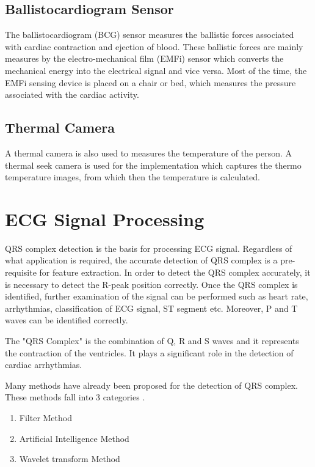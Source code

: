 \subsection{Ballistocardiogram Sensor}
The ballistocardiogram (BCG) sensor measures the ballistic forces associated with cardiac contraction and ejection of blood. These ballistic forces are mainly measures by the electro-mechanical film (EMFi) sensor which converts the mechanical energy into the electrical signal and vice versa. Most of the time, the EMFi sensing device is placed on a chair or bed, which measures the pressure associated with the cardiac activity.

\subsection{Thermal Camera}
A thermal camera is also used to measures the temperature of the person. A thermal seek camera is used for the implementation which captures the thermo temperature images, from which then the temperature is calculated.

\section{ECG Signal Processing}
QRS complex detection is the basis for processing ECG signal. Regardless of what application is required, the accurate detection of QRS complex is a pre-requisite for feature extraction. In order to detect the QRS complex accurately, it is necessary to detect the R-peak position correctly. Once the QRS complex is identified, further examination of the signal can be performed such as heart rate, arrhythmias, classification of ECG signal, ST segment etc. Moreover, P and T waves can be identified correctly.

The "QRS Complex" is the combination of Q, R and S waves and it represents the contraction of the ventricles. It plays a significant role in the detection of cardiac arrhythmias.

Many methods have already been proposed for the detection of QRS complex. These methods fall into 3 categories \cite{5639905}.

\begin{enumerate}
	\item Filter Method
	\item Artificial Intelligence Method
	\item Wavelet transform Method
\end{enumerate}

